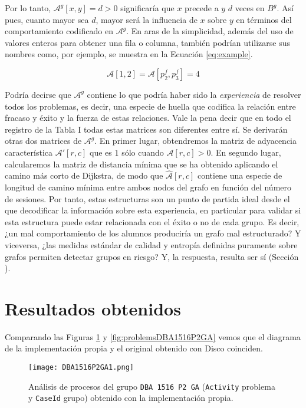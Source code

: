 Por lo tanto, $\mathcal{A}^g[x,y] = d > 0$ significaría que $x$ precede a $y$ $d$ veces en $B^g$. Así pues, cuanto mayor sea $d$, mayor será la influencia de $x$ sobre $y$ en términos del comportamiento codificado en $\mathcal{A}^g$. En aras de la simplicidad, además del uso de valores enteros para obtener una fila o columna, también podrían utilizarse sus nombres como, por ejemplo, se muestra en la Ecuación \ref{eq:example}.

\begin{equation}\label{eq:example}
\mathcal{A}[1,2] = \mathcal{A}[p_2^f,p_3^f] = 4
\end{equation}

Podría decirse que $\mathcal{A}^g$ contiene lo que podría haber sido la \emph{experiencia} de resolver todos los problemas, es decir, una especie de huella que codifica la relación entre fracaso y éxito y la fuerza de estas relaciones. Vale la pena decir que en todo el registro de la Tabla I todas estas matrices son diferentes entre sí. Se derivarán otras dos matrices de $\mathcal{A}^g$. En primer lugar, obtendremos la matriz de adyacencia característica $\mathcal{A}'[r, c]$ que es $1$ sólo cuando $\mathcal{A}[r, c] > 0$. En segundo lugar, calcularemos la matriz de distancia mínima que se ha obtenido aplicando el camino más corto de Dijkstra, de modo que $\hat{\mathcal{A}}[r, c]$ contiene una especie de longitud de camino mínima entre ambos nodos del grafo en función del número de sesiones. Por tanto, estas estructuras son un punto de partida ideal desde el que decodificar la información sobre esta experiencia, en particular para validar si esta estructura puede estar relacionada con el éxito o no de cada grupo. Es decir, ¿un mal comportamiento de los alumnos produciría un grafo mal estructurado? Y viceversa, ¿las medidas estándar de calidad y entropía definidas puramente sobre grafos permiten detectar grupos en riesgo?
Y, la respuesta, resulta ser sí (Sección ).

\section{Resultados obtenidos}

Comparando las Figuras \ref{fig:DBA1516P2GA1} y \ref{fig:problemsDBA1516P2GA} vemos que el diagrama de la implementación propia y el original obtenido con Disco coinciden.

\begin{figure}[H]
    \centering
    \texttt{[image: DBA1516P2GA1.png]}
    \caption{Análisis de procesos del grupo \texttt{DBA 1516 P2 GA} (\texttt{Activity} problema y \texttt{CaseId} grupo) obtenido con la implementación propia.}
    \label{fig:DBA1516P2GA1}
\end{figure}

